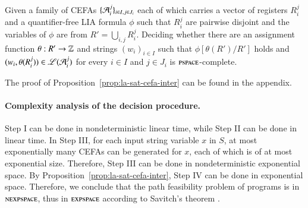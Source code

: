 %	
% 

\begin{proposition}\label{prop:la-sat-cefa-inter}
	Given a family of CEFAs $\{ \mathcal{A}_i^{j} \}_{i\in I,j\in J_i}$ each of which carries a vector of registers $R_i^j$ and a quantifier-free LIA formula $\phi$ such that  $ R_i^{j} $ are pairwise disjoint and the variables of $\phi$ are from $R'=\bigcup_{i,j} R_i^j$. Deciding whether  %
	there are an assignment function $\theta: R' \rightarrow \mathbb{Z}$ and strings $(w_i)_{i \in I}$ such that  $\phi[\theta(R' )/R']$ holds and $(w_i, \theta(R_i^j)) \in \mathscr{L}(\mathcal{A}_{i}^j)$ for every $i \in I$ and $j \in J_i$ is $\textsc{pspace}$-complete. 
\end{proposition}

The proof of Proposition~\ref{prop:la-sat-cefa-inter} can be found in the appendix.



\paragraph*{Complexity analysis of the decision procedure.} Step I can be done in nondeterministic linear time, while Step II can be done in linear time. %
In Step III, for each input string variable $x$ in $S$, at most exponentially many CEFAs can be generated for $x$, each of which is of at most exponential size. Therefore, Step III can be done in nondeterministic exponential space. By Proposition~\ref{prop:la-sat-cefa-inter}, Step IV can be done in exponential space. Therefore, we conclude that the path feasibility problem of {\slint} programs is in $\textsc{nexpspace}$, thus in $\textsc{expspace}$ according to Savitch's theorem \cite{complexity-book}. 



